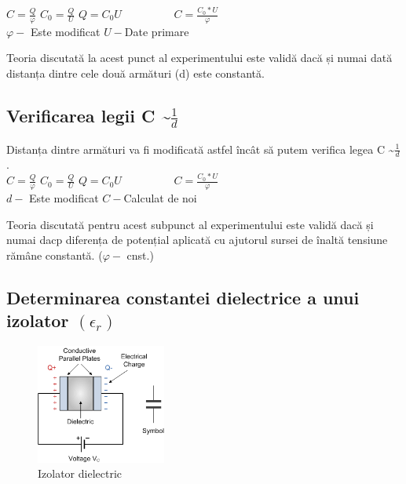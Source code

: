 \documentclass[12pt]{article}
\begin{document}
$C=\frac{Q}{\varphi}$ \hspace{2cm} $C_{0}=\frac{Q}{U}$ \hspace{2cm}  $Q=C_{0}U \hspace{2cm}  C=\frac{C_{0}*U}{\varphi}$\\

$\varphi- $ Este modificat \hspace{2cm} $U- $Date primare\\

\begin{tcolorbox}[colback=yellow!10!white, colframe=black, title=Observație]
Teoria discutată la acest punct al experimentului este validă dacă și numai dată distanța dintre cele două armături (d) este constantă.
\end{tcolorbox}

\subsection{Verificarea legii C \textasciitilde $\frac{1}{d}$}
Distanța dintre armături va fi modificată astfel încât să putem verifica legea C \textasciitilde $\frac{1}{d}$.\\

$C=\frac{Q}{\varphi}$ \hspace{2cm} $C_{0}=\frac{Q}{U}$ \hspace{2cm}  $Q=C_{0}U \hspace{2cm}  C=\frac{C_{0}*U}{\varphi}$\\

$d- $ Este modificat \hspace{2cm} $C- $Calculat de noi\\

\begin{tcolorbox}[colback=yellow!10!white, colframe=black, title=Observație]
Teoria discutată pentru acest subpunct al experimentului este validă dacă și numai dacp diferența de potențial aplicată cu ajutorul
sursei de înaltă tensiune rămâne constantă. ($\varphi- $ cnst.)
\end{tcolorbox}

\subsection{ Determinarea constantei dielectrice a unui izolator \textbf{$(\epsilon_{r})$}}

\begin{figure} 
    \centering
    \includegraphics[width=0.38\textwidth]{dielectric.png} 
    \caption{Izolator dielectric}
    \label{fig:Dielectric}
\end{figure}
\end{document}
